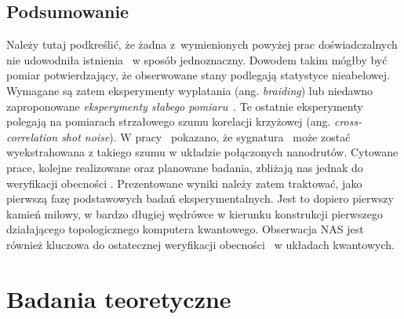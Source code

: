 \subsection*{Podsumowanie}
Należy tutaj podkreślić, że żadna z~wymienionych powyżej prac doświadczalnych nie udowodniła istnienia \MZM\ w  sposób jednoznaczny.
Dowodem takim mógłby być pomiar potwierdzający, że obserwowane stany podlegają statystyce nieabelowej.
Wymagane są zatem eksperymenty wyplatania (ang. \textit{braiding}) lub niedawno zaproponowane \textit{eksperymenty słabego pomiaru}~\cite{manousakis.wille.2020}.
Te ostatnie eksperymenty polegają na pomiarach 
strzałowego szumu korelacji krzyżowej (ang. \textit{cross-correlation shot noise}).
W pracy~\cite{manousakis.wille.2020} pokazano, że sygnatura \MZM\ może zostać wyekstrahowana z takiego szumu w układzie połączonych nanodrutów.
Cytowane prace, kolejne realizowane oraz planowane badania, zbliżają nas jednak do weryfikacji obecności \MZM.
Prezentowane wyniki należy zatem traktować, jako pierwszą fazę podstawowych badań eksperymentalnych.
Jest to dopiero pierwszy kamień milowy, w bardzo długiej wędrówce w kierunku konstrukcji pierwszego działającego topologicznego komputera kwantowego.
Obserwacja \acrshort{NAS} jest również kluczowa do ostatecznej weryfikacji obecności \MZM\ w układach kwantowych.


\ornament


\section{Badania teoretyczne}
\label{sec:theoreticalPerspectives}

